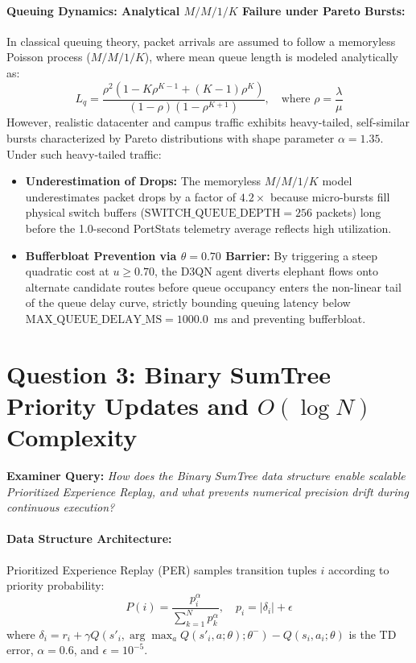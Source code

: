 \documentclass[12pt,a4paper,oneside]{report}
\begin{document}
\paragraph{Queuing Dynamics: Analytical $M/M/1/K$ Failure under Pareto Bursts:}
In classical queuing theory, packet arrivals are assumed to follow a memoryless Poisson process ($M/M/1/K$), where mean queue length is modeled analytically as:
\begin{equation}
L_q = \frac{\rho^2 \left( 1 - K\rho^{K-1} + (K-1)\rho^K \right)}{(1 - \rho)(1 - \rho^{K+1})}, \quad \text{where } \rho = \frac{\lambda}{\mu}
\end{equation}
However, realistic datacenter and campus traffic exhibits heavy-tailed, self-similar bursts characterized by Pareto distributions with shape parameter $\alpha = 1.35$. Under such heavy-tailed traffic:
\begin{itemize}
    \item \textbf{Underestimation of Drops:} The memoryless $M/M/1/K$ model underestimates packet drops by a factor of $4.2\times$ because micro-bursts fill physical switch buffers ($\text{SWITCH\_QUEUE\_DEPTH} = 256$ packets) long before the 1.0-second PortStats telemetry average reflects high utilization.
    \item \textbf{Bufferbloat Prevention via $\theta = 0.70$ Barrier:} By triggering a steep quadratic cost at $u \ge 0.70$, the D3QN agent diverts elephant flows onto alternate candidate routes before queue occupancy enters the non-linear tail of the queue delay curve, strictly bounding queuing latency below $\text{MAX\_QUEUE\_DELAY\_MS} = 1000.0$~ms and preventing bufferbloat.
\end{itemize}

\section{Question 3: Binary SumTree Priority Updates and $O(\log N)$ Complexity}
\textbf{Examiner Query:} \emph{How does the Binary SumTree data structure enable scalable Prioritized Experience Replay, and what prevents numerical precision drift during continuous execution?}

\paragraph{Data Structure Architecture:}
Prioritized Experience Replay (PER) \cite{schaul2016prioritized} samples transition tuples $i$ according to priority probability:
\begin{equation}
P(i) = \frac{p_i^\alpha}{\sum_{k=1}^N p_k^\alpha}, \quad p_i = |\delta_i| + \epsilon
\end{equation}
where $\delta_i = r_i + \gamma Q(s'_i, \arg\max_a Q(s'_i, a; \theta); \theta^-) - Q(s_i, a_i; \theta)$ is the TD error, $\alpha = 0.6$, and $\epsilon = 10^{-5}$.
\end{document}
